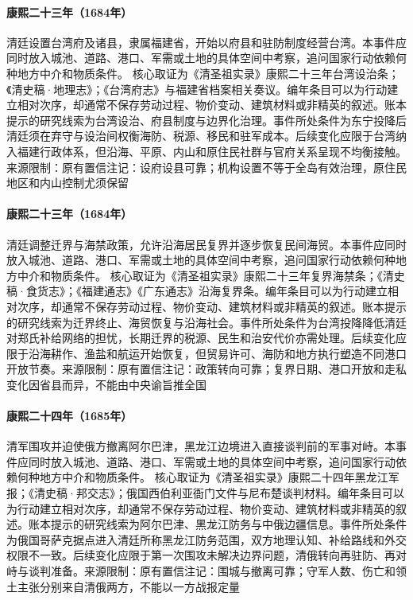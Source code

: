 \hypertarget{civic:EQ-1684-TAIWAN-PREFECTURE}{}\paragraph{康熙二十三年（1684年）}清廷设置台湾府及诸县，隶属福建省，开始以府县和驻防制度经营台湾。本事件应同时放入城池、道路、港口、军需或土地的具体空间中考察，追问国家行动依赖何种地方中介和物质条件。 核心取证为《清圣祖实录》康熙二十三年台湾设治条；《清史稿·地理志》；《台湾府志》与福建省档案相关奏议。编年条目可以为行动建立相对次序，却通常不保存劳动过程、物价变动、建筑材料或非精英的叙述。账本提示的研究线索为台湾设治、府县制度与边界化治理。事件所处条件为东宁投降后清廷须在弃守与设治间权衡海防、税源、移民和驻军成本。后续变化应限于台湾纳入福建行政体系，但沿海、平原、内山和原住民社群与官府关系呈现不均衡接触。来源限制：原有置信注记：设府设县可靠；机构设置不等于全岛有效治理，原住民地区和内山控制尤须保留
\hypertarget{civic:EQ-1684-SEA-BAN-LIFT}{}\paragraph{康熙二十三年（1684年）}清廷调整迁界与海禁政策，允许沿海居民复界并逐步恢复民间海贸。本事件应同时放入城池、道路、港口、军需或土地的具体空间中考察，追问国家行动依赖何种地方中介和物质条件。 核心取证为《清圣祖实录》康熙二十三年复界海禁条；《清史稿·食货志》；《福建通志》《广东通志》沿海复界条。编年条目可以为行动建立相对次序，却通常不保存劳动过程、物价变动、建筑材料或非精英的叙述。账本提示的研究线索为迁界终止、海贸恢复与沿海社会。事件所处条件为台湾投降降低清廷对郑氏补给网络的担忧，长期迁界的税源、民生和治安代价亦需处理。后续变化应限于沿海耕作、渔盐和航运开始恢复，但贸易许可、海防和地方执行塑造不同港口开放节奏。来源限制：原有置信注记：政策转向可靠；复界日期、港口开放和走私变化因省县而异，不能由中央谕旨推全国
\hypertarget{civic:EQ-1685-ALBAZIN-FIRST}{}\paragraph{康熙二十四年（1685年）}清军围攻并迫使俄方撤离阿尔巴津，黑龙江边境进入直接谈判前的军事对峙。本事件应同时放入城池、道路、港口、军需或土地的具体空间中考察，追问国家行动依赖何种地方中介和物质条件。 核心取证为《清圣祖实录》康熙二十四年黑龙江军报；《清史稿·邦交志》；俄国西伯利亚衙门文件与尼布楚谈判材料。编年条目可以为行动建立相对次序，却通常不保存劳动过程、物价变动、建筑材料或非精英的叙述。账本提示的研究线索为阿尔巴津、黑龙江防务与中俄边疆信息。事件所处条件为俄国哥萨克据点进入清廷所称黑龙江防务范围，双方地理认知、补给路线和外交权限不一致。后续变化应限于第一次围攻未解决边界问题，清俄转向再驻防、再对峙与谈判准备。来源限制：原有置信注记：围城与撤离可靠；守军人数、伤亡和领土主张分别来自清俄两方，不能以一方战报定量
